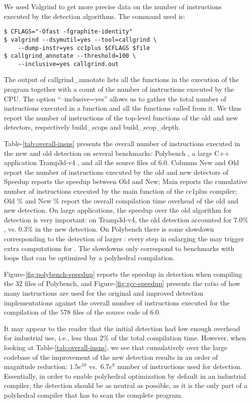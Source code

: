 \documentclass{sig-alternate}
\begin{document}
We used Valgrind to get more precise data on the number of instructions executed
by the \SCoP{} detection algorithms.  The command used is:
\begin{verbatim}
$ CFLAGS="-Ofast -fgraphite-identity"
$ valgrind --dsymutil=yes --tool=callgrind \
    --dump-instr=yes cc1plus $CFLAGS $file
$ callgrind_annotate --threshold=100 \
    --inclusive=yes callgrind.out
\end{verbatim}

The output of callgrind\_annotate lists all the functions in the execution of
the program together with a count of the number of instructions executed by the
CPU.  The option ``--inclusive=yes'' allows us to gather the total number of
instructions executed in a function and all the functions called from it.  We
thus report the number of instructions of the top-level functions of the old and
new \SCoP{} detectors, respectively build\_scops and build\_scop\_depth.

Table-\ref{tab:overall-insns} presents the overall number of instructions
executed in the new and old \SCoP{} detection on several benchmarks: Polybench
\cite{polybench}, a large C++ application Tramp3d-v4 \cite{richi}, and all the
source files of \GCC{} 6.0.  Columns New and Old report the number of instructions
executed by the old and new \SCoP{} detectors of \GCC{;} Speedup reports the speedup
between Old and New; Main reports the cumulative number of instructions executed
by the main function of the \GCC{} cc1plus compiler; Old \% and New \% report the
overall compilation time overhead of the old and new \SCoP{} detection.  On large
applications, the speedup over the old algorithm for \SCoP{} detection is very
important: on Tramp3d-v4, the old \SCoP{} detection accounted for $7.0\%$, vs.
$0.3\%$ in the new \SCoP{} detection.  On Polybench there is some slowdown
corresponding to the detection of larger \SCoP{s}: every step in enlarging the \SCoP{}
may trigger extra computations for \scev{s}.  The slowdowns only correspond to
benchmarks with loops that can be optimized by a polyhedral compilation.

Figure-\ref{fig:polybench-speedup} reports the speedup in \SCoP{} detection when
compiling the $32$ files of Polybench, and Figure-\ref{fig:gcc-speedup} presents
the ratio of how many instructions are used for the original and improved
\SCoP{} detection implementations against the overall number of instructions
executed for the compilation of the $578$ files of the source code of \GCC{}
6.0.

It may appear to the reader that the initial \SCoP{} detection had low enough
overhead for industrial use, i.e., less than $2\%$ of the total compilation
time.  However, when looking at Table-\ref{tab:overall-insns}, we see that
cumulatively over the large codebase of \GCC{,} the improvement of the new
\SCoP{} detection results in an order of magnitude reduction: $1.5e^{10}$
vs{.}{~}$6.7e^8$ number of instructions used for \SCoP{} detection.
Essentially, in order to enable polyhedral optimization by default in an
industrial compiler, the \SCoP{} detection should be as neutral as possible, as
it is the only part of a polyhedral compiler that has to scan the complete
program.
\end{document}

